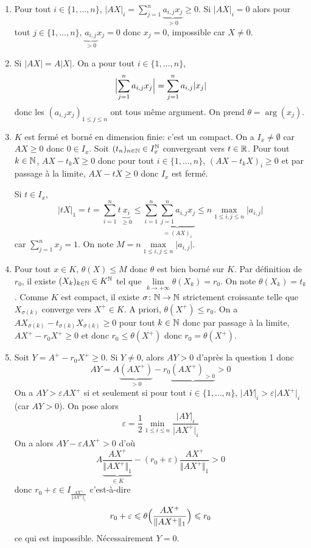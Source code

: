 \begin{solution}
	\phantom{}
	\begin{enumerate}
		\item Pour tout $i\in\{1,\dots,n\}$, $\vert AX\vert_{i}=\sum_{j=1}^{n}\underbrace{a_{i,j}x_{j}}_{>0}\geqslant0$. Si $\vert AX\vert_{i}=0$ alors pour tout $j\in\{1,\dots,n\}$, $\underbrace{a_{i,j}}_{>0}x_{j}=0$ donc $x_{j}=0$, impossible car $X\neq 0$.
		
		\item Si $\vert AX\vert=A\vert X\vert$. On a pour tout $i\in\{1,\dots,n\}$,
		$$\Bigl\lvert\sum_{j=1}^{n}a_{i,j}x_{j}\Bigr\rvert=\sum_{j=1}^{n}a_{i,j}\lvert x_{j}\rvert$$
		donc les $(a_{i,j}x_{j})_{1\leqslant j\leqslant n}$ ont tous même argument. On prend $\theta=\arg(x_{j})$.

		\item $K$ est fermé et borné en dimension finie: c'est un compact. On a $I_{x}\neq\emptyset$ car $AX\geqslant0$ donc $0\in I_{x}$. Soit $(t_{n})_{n\in\mathbb{N}}\in I_{x}^{\mathbb{N}}$ convergeant vers $t\in\mathbb{R}$. Pour tout $k\in\mathbb{N}$, $AX-t_{k}X\geqslant0$ donc pour tout $i\in\{1,\dots,n\}$, $(AX-t_{k}X)_{i}\geqslant0$ et par passage à la limite, $AX-tX\geqslant0$ donc $I_{x}$ est fermé.
		
		Si $t\in I_{x}$, 
		$$\vert tX\vert_{1}=t=\sum_{i=1}^{n}t\underbrace{x_{i}}_{\geqslant0}\leqslant\sum_{i=1}^{n}\underbrace{\sum_{j=1}^{n}a_{i,j}x_{j}}_{=(AX)_{i}}\leqslant n\max\limits_{1\leqslant i,j\leqslant n}\vert a_{i,j}\vert$$
		car $\sum_{j=1}^{n}x_{j}=1$.
		On note $M=n\max\limits_{1\leqslant i,j\leqslant n}\vert a_{i,j}\vert$.

		\item Pour tout $x\in K$, $\theta(X)\leqslant M$ donc $\theta$ est bien borné sur $K$. Par définition de $r_{0}$, il existe $(X_{k})_{k\in\mathbb{N}}\in K^{\mathbb{N}}$ tel que $\lim\limits_{k\to+\infty}\theta(X_k)=r_{0}$. On note $\theta(X_{k})=t_{k}$. Comme $K$ est compact, il existe $\sigma\colon\mathbb{N}\to\mathbb{N}$ strictement croissante telle que $X_{\sigma(k)}$ converge vers $X^{+}\in K$. A priori, $\theta(X^{+})\leqslant r_{0}$. On a $AX_{\sigma(k)}-t_{\sigma(k)}X_{\sigma(k)}\geqslant0$ pour tout $k\in\mathbb{N}$ donc par passage à la limite, $AX^{+}-r_{0}X^{+}\geqslant0$ et donc $r_{0}\leqslant\theta(X^{+})$ donc $r_{0}=\theta(X^{+})$.
		
		\item Soit $Y=A^{+}-r_{0}X^{+}\geqslant0$. Si $Y\neq0$, alors $AY>0$ d'après la question 1 donc 
		$$AY=A\underbrace{(AX^{+})}_{>0}-r_{0}\underbrace{(AX^{+})_{>0}}>0$$
		On a $AY>\varepsilon AX^{+}$ si et seulement si pour tout $i\in\{1,\dots,n\}$, $\vert AY\vert_{i}>\varepsilon\vert AX^{+}\vert_{i}$ (car $AY>0$). On pose alors 
		$$\varepsilon=\frac{1}{2}\min\limits_{1\leqslant i\leqslant n}\frac{\vert AY\vert_{i}}{\vert AX^{+}\vert_{i}}$$
		On a alors $AY-\varepsilon AX^{+}>0$ d'où 
		$$A\underbrace{\frac{AX^{+}}{\Vert AX^{+}\Vert_{1}}}_{\in K}-(r_{0}+\varepsilon)\frac{AX^{+}}{\Vert AX^{+}\Vert_{1}}>0$$
		donc $r_{0}+\varepsilon\in I_{\frac{AX^{+}}{\Vert AX^{+}\Vert_{1}}}$ c'est-à-dire 
		$$r_{0}+\varepsilon\leqslant\theta\Bigl(\frac{AX^{+}}{\Vert AX^{+}\Vert_{1}}\Bigr)\leqslant r_{0}$$
		ce qui est impossible. Nécessairement $Y=0$.


\end{enumerate}
\end{solution}
